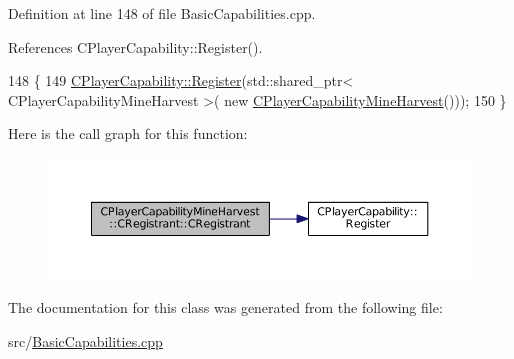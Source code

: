 Definition at line 148 of file Basic\+Capabilities.\+cpp.



References C\+Player\+Capability\+::\+Register().


\begin{DoxyCode}
148                                                     \{
149     \hyperlink{classCPlayerCapability_a7e298018dcde2684451add3cfff065f7}{CPlayerCapability::Register}(std::shared\_ptr< CPlayerCapabilityMineHarvest >(\textcolor{keyword}{
      new} \hyperlink{classCPlayerCapabilityMineHarvest_aa170d0c33386809d234b73a2b0cf516d}{CPlayerCapabilityMineHarvest}()));   
150 \}
\end{DoxyCode}
Here is the call graph for this function\+:\nopagebreak
\begin{figure}[H]
\begin{center}
\leavevmode
\includegraphics[width=350pt]{classCPlayerCapabilityMineHarvest_1_1CRegistrant_a5d672b383de5f1539b5ca0cc9f18674d_cgraph}
\end{center}
\end{figure}


The documentation for this class was generated from the following file\+:\begin{DoxyCompactItemize}
\item 
src/\hyperlink{BasicCapabilities_8cpp}{Basic\+Capabilities.\+cpp}\end{DoxyCompactItemize}
